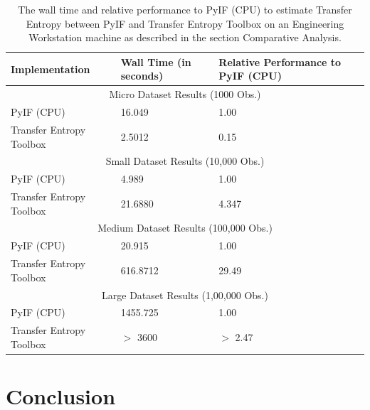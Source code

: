 \documentclass[conference]{IEEEtran}
\begin{document}
\begin{table}[htbp]
\begin{center}
\begin{tabular}{ |p{4cm}|p{1cm}| p{2cm}|  }
		\end{tabular}
	\end{center}
	
		
	\label{DataTable}
\end{table}


\begin{table}[htbp]
	\caption{The wall time and relative performance to PyIF (CPU) to estimate Transfer Entropy between PyIF and Transfer Entropy Toolbox on an Engineering Workstation machine as described in the section Comparative Analysis.}
	\begin{center}
		\begin{tabular}{ |p{3cm}|p{2cm}| p{2cm}|  }
			\hline
			Implementation & Wall Time (in seconds) &  Relative Performance to PyIF (CPU) \\
 			\hline
			 \multicolumn{3}{|c|}{Micro Dataset Results (1000 Obs.)} \\
 			\hline
 			PyIF (CPU)   & 16.049 & 1.00\\
 			Transfer Entropy Toolbox & 2.5012 & 0.15 \\
 			 \hline
 			\multicolumn{3}{|c|}{Small Dataset Results (10,000 Obs.)} \\
 			\hline
 			PyIF (CPU)   & 4.989 & 1.00\\
			 Transfer Entropy Toolbox & 21.6880 & 4.347 \\
 			 \hline
 			\multicolumn{3}{|c|}{Medium Dataset Results (100,000 Obs.)} \\
 			\hline
 			PyIF (CPU)   & 20.915 & 1.00\\
			Transfer Entropy Toolbox & 616.8712 & 29.49 \\
 			 \hline
 			\multicolumn{3}{|c|}{Large Dataset Results (1,00,000 Obs.)} \\
 			\hline
 			PyIF (CPU)   & 1455.725 & 1.00\\
			 Transfer Entropy Toolbox & $>$ 3600 & $>$ 2.47\\
			 \hline
			 

		\end{tabular}
	\end{center}
	\label{DataTable-MATLAB}
	
\end{table}


\section{Conclusion}
\end{document}
